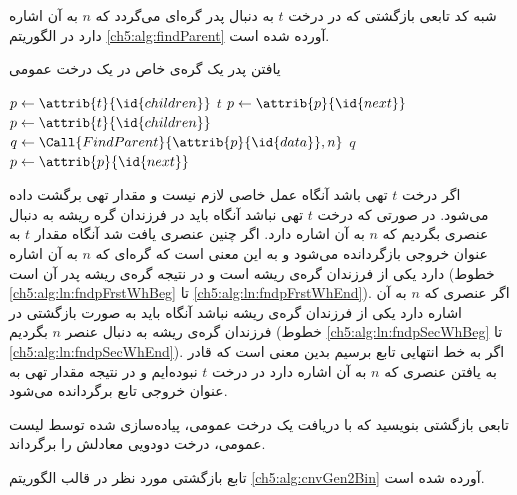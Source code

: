 
شبه کد تابعی بازگشتی که در درخت {$t$} به دنبال پدر گره‌‌‌ای می‌گردد که {$n$} به آن اشاره دارد در الگوریتم {\eqref{ch5:alg:findParent}} آورده شده است.

\begin{algorithm}
\caption{یافتن پدر یک گره‌ی خاص در یک درخت عمومی}\label{ch5:alg:findParent}
\begin{latin}
\begin{algorithmic}[1]
				\State	\Return {}
		\EndIf
		\State	$p \gets \attrib{t}{\id{children}}$\label{ch5:alg:ln:fndpFrstWhBeg}
						\State	\Return $t$
				\EndIf
				\State	$p \gets \attrib{p}{\id{next}}$
		\EndWhile\label{ch5:alg:ln:fndpFrstWhEnd}
		\State	$p \gets \attrib{t}{\id{children}}$\label{ch5:alg:ln:fndpSecWhBeg}		
				\State	$q \gets \Call{FindParent}{\attrib{p}{\id{data}},n}$
						\State	\Return $q$
				\EndIf
				\State	$p \gets \attrib{p}{\id{next}}$
		\EndWhile\label{ch5:alg:ln:fndpSecWhEnd}
		\State	\Return {}
\EndFunction
\end{algorithmic}
\end{latin}
\end{algorithm}

اگر درخت {$t$} تهی باشد آنگاه عمل خاصی لازم نیست و مقدار تهی برگشت داده می‌شود. در صورتی که درخت {$t$} تهی نباشد آنگاه باید در فرزندان گره ریشه به دنبال عنصری بگردیم که {$n$} به آن اشاره دارد. اگر چنین عنصری یافت شد آنگاه مقدار {$t$} به عنوان خروجی بازگردانده می‌شود و به این معنی است که گره‌ای که {$n$} به آن اشاره دارد یکی از فرزندان گره‌ی ریشه است و در نتیجه گره‌ی ریشه پدر آن است (خطوط {\ref{ch5:alg:ln:fndpFrstWhBeg}} تا {\ref{ch5:alg:ln:fndpFrstWhEnd}}). اگر عنصری که {$n$} به آن اشاره دارد یکی از فرزندان گره‌ی ریشه نباشد آنگاه باید به صورت بازگشتی در فرزندان گره‌ی ریشه به دنبال عنصر {$n$} بگردیم (خطوط {\ref{ch5:alg:ln:fndpSecWhBeg}} تا {\ref{ch5:alg:ln:fndpSecWhEnd}}). اگر به خط انتهایی تابع برسیم بدین معنی است که قادر به یافتن عنصری که {$n$} به آن اشاره دارد در درخت {$t$} نبوده‌ایم و در نتیجه مقدار تهی به عنوان خروجی تابع برگردانده می‌شود.

 تابعی بازگشتی بنویسید که با دریافت یک درخت عمومی، پیاده‌سازی شده توسط لیست عمومی، درخت دودویی معادلش را برگرداند. 


تابع بازگشتی مورد نظر در قالب الگوریتم {\eqref{ch5:alg:cnvGen2Bin}} آورده شده است.

